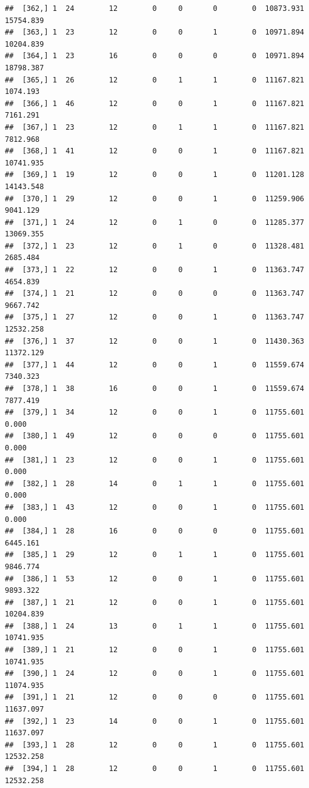 \documentclass[
]{article}
\begin{document}
\begin{verbatim}
##  [362,] 1  24        12        0     0       0        0  10873.931  15754.839
##  [363,] 1  23        12        0     0       1        0  10971.894  10204.839
##  [364,] 1  23        16        0     0       0        0  10971.894  18798.387
##  [365,] 1  26        12        0     1       1        0  11167.821   1074.193
##  [366,] 1  46        12        0     0       1        0  11167.821   7161.291
##  [367,] 1  23        12        0     1       1        0  11167.821   7812.968
##  [368,] 1  41        12        0     0       1        0  11167.821  10741.935
##  [369,] 1  19        12        0     0       1        0  11201.128  14143.548
##  [370,] 1  29        12        0     0       1        0  11259.906   9041.129
##  [371,] 1  24        12        0     1       0        0  11285.377  13069.355
##  [372,] 1  23        12        0     1       0        0  11328.481   2685.484
##  [373,] 1  22        12        0     0       1        0  11363.747   4654.839
##  [374,] 1  21        12        0     0       0        0  11363.747   9667.742
##  [375,] 1  27        12        0     0       1        0  11363.747  12532.258
##  [376,] 1  37        12        0     0       1        0  11430.363  11372.129
##  [377,] 1  44        12        0     0       1        0  11559.674   7340.323
##  [378,] 1  38        16        0     0       1        0  11559.674   7877.419
##  [379,] 1  34        12        0     0       1        0  11755.601      0.000
##  [380,] 1  49        12        0     0       0        0  11755.601      0.000
##  [381,] 1  23        12        0     0       1        0  11755.601      0.000
##  [382,] 1  28        14        0     1       1        0  11755.601      0.000
##  [383,] 1  43        12        0     0       1        0  11755.601      0.000
##  [384,] 1  28        16        0     0       0        0  11755.601   6445.161
##  [385,] 1  29        12        0     1       1        0  11755.601   9846.774
##  [386,] 1  53        12        0     0       1        0  11755.601   9893.322
##  [387,] 1  21        12        0     0       1        0  11755.601  10204.839
##  [388,] 1  24        13        0     1       1        0  11755.601  10741.935
##  [389,] 1  21        12        0     0       1        0  11755.601  10741.935
##  [390,] 1  24        12        0     0       1        0  11755.601  11074.935
##  [391,] 1  21        12        0     0       0        0  11755.601  11637.097
##  [392,] 1  23        14        0     0       1        0  11755.601  11637.097
##  [393,] 1  28        12        0     0       1        0  11755.601  12532.258
##  [394,] 1  28        12        0     0       1        0  11755.601  12532.258

\end{verbatim}
\end{document}

